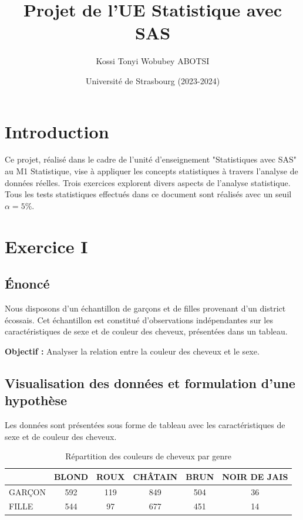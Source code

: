 \documentclass[12pt,a4paper]{article}
\title{Projet de l'UE Statistique avec SAS}
\author{Kossi Tonyi Wobubey ABOTSI}
\date{Université de Strasbourg (2023-2024)}
\begin{document}
	
	\maketitle
	
	\tableofcontents
	
	\newpage
	
	\section{Introduction}
	Ce projet, réalisé dans le cadre de l'unité d'enseignement "Statistiques avec SAS" au M1 Statistique, vise à appliquer les concepts statistiques à travers l'analyse de données réelles. Trois exercices explorent divers aspects de l'analyse statistique. Tous les tests statistiques effectués dans ce document sont réalisés avec un seuil \(\alpha = 5\%\).
	
	\section{Exercice I}
	
	\subsection{Énoncé}
	Nous disposons d'un échantillon de garçons et de filles provenant d'un district écossais. Cet échantillon est constitué d'observations indépendantes sur les caractéristiques de sexe et de couleur des cheveux, présentées dans un tableau.
	
	\textbf{Objectif :} Analyser la relation entre la couleur des cheveux et le sexe.
	
	\subsection{Visualisation des données et formulation d'une hypothèse}
	Les données sont présentées sous forme de tableau avec les caractéristiques de sexe et de couleur des cheveux.
	
	\begin{table}[H]
		\centering
		\begin{tabular}{@{}lccccc@{}}
			\toprule
			& \textbf{BLOND} & \textbf{ROUX} & \textbf{CHÂTAIN} & \textbf{BRUN} & \textbf{NOIR DE JAIS} \\ \midrule
			GARÇON & 592            & 119           & 849              & 504           & 36                    \\
			FILLE  & 544            & 97            & 677              & 451           & 14                    \\ \bottomrule
		\end{tabular}
		\caption{Répartition des couleurs de cheveux par genre}
	\end{table}
	
\end{document}
